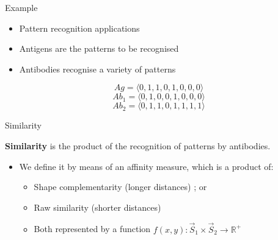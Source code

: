\documentclass[xcolor=svgnames]{beamer}
\begin{document}
        \begin{frame}{Example}
        
            
            \begin{itemize}
                \item Pattern recognition applications
                \item Antigens are the patterns to be recognised
                \item Antibodies recognise a variety of patterns
            \end{itemize}            
            \vspace{1em}
            
            $$Ag = \langle 0, 1, 1, 0, 1, 0, 0, 0 \rangle$$
            $$Ab_{1} = \langle 0, 1, 0, 0, 1, 0, 0, 0 \rangle$$
            $$Ab_{2} = \langle 0, 1, 1, 0, 1, 1, 1, 1 \rangle$$
            
            
        \end{frame}
      
        \begin{frame}{Similarity}            
            
            \textbf{Similarity} is the product of the recognition of patterns by antibodies.
            \vspace{1em}
            \begin{itemize}
                \item We define it by means of an affinity measure, which is a product of:
                \begin{itemize}
                    \item Shape complementarity (longer distances) ; or %
                    \item Raw similarity (shorter distances) %
                \end{itemize}
                \vspace{0.5em}
                \begin{itemize}
                    \item Both represented by a function $f(x,y): \vec{S}_1 \times \vec{S}_2 \rightarrow \mathbb{R}^+$
                \end{itemize}
            \end{itemize}    
        \end{frame}
        
\end{document}
